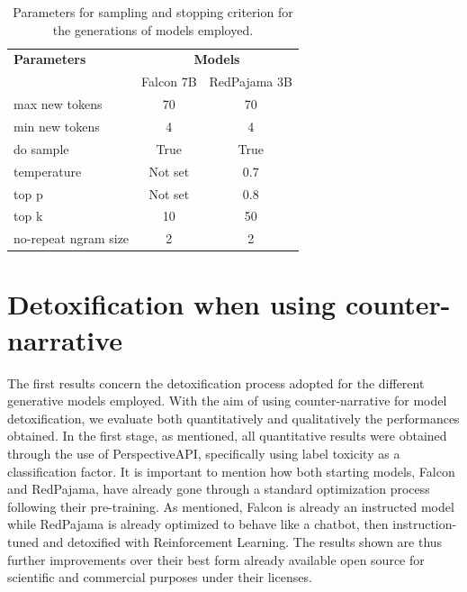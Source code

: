\begin{table}[h]
\centering
\begin{tabular}{lcc}
\toprule
\textbf{Parameters} & \multicolumn{2}{c}{\textbf{Models}} \\ \cmidrule(l){2-3} 
 & Falcon 7B & RedPajama 3B \\ 
\midrule
max new tokens          & 70 & 70 \\
min new tokens          & 4 & 4 \\ 
do sample               & True & True \\ 
temperature             & Not set & 0.7 \\ 
top p                   & Not set & 0.8 \\ 
top k                   & 10 & 50 \\ 
no-repeat ngram size    & 2 & 2 \\ 
\bottomrule
\end{tabular}
\caption{Parameters for sampling and stopping criterion for the generations of models employed.}
\label{tab:generation-parameters}
\end{table}



\section {Detoxification when using counter-narrative}

The first results concern the detoxification process adopted for the different generative models employed. With the aim of using counter-narrative for model detoxification, we evaluate both quantitatively and qualitatively the performances obtained. In the first stage, as mentioned, all quantitative results were obtained through the use of PerspectiveAPI, specifically using label toxicity as a classification factor. It is important to mention how both starting models, Falcon and RedPajama, have already gone through a standard optimization process following their pre-training. As mentioned, Falcon is already an instructed model while RedPajama is already optimized to behave like a chatbot, then instruction-tuned and detoxified with Reinforcement Learning. The results shown are thus further improvements over their best form already available open source for scientific and commercial purposes under their licenses.

